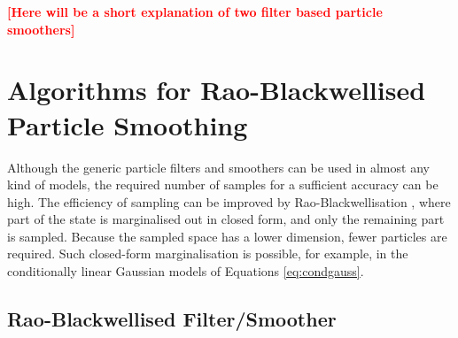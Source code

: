\documentclass[twocolumn]{autart}    %
\newcommand{\comment}[1]{\textcolor{red}{\textbf{[#1]}}}
\begin{document}
\comment{Here will be a short explanation of two filter based particle
  smoothers}



\section{Algorithms for Rao-Blackwellised Particle Smoothing}

Although the generic particle filters and smoothers can be used in almost any kind of models, the required number of samples for a sufficient accuracy can be high. The efficiency of sampling can be improved by Rao-Blackwellisation \cite{Doucet+Godsill+Andrieu:2000,Chen+Liu:2000}, where part of the state is marginalised out in closed form, and only the remaining part is sampled. Because the sampled space has a lower dimension, fewer particles are required. Such closed-form marginalisation is possible, for example, in the conditionally linear Gaussian models of Equations \eqref{eq:condgauss}.



\subsection{Rao-Blackwellised Filter/Smoother}
\end{document}
